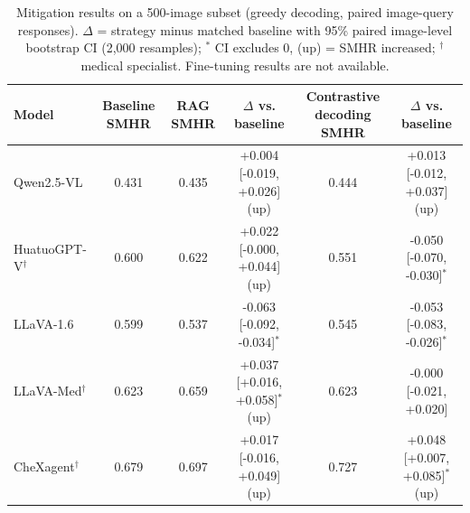 \begin{table}[t]
\centering
\footnotesize
\begin{tabular}{lccccc}
\toprule
Model & Baseline SMHR & RAG SMHR & $\Delta$ vs. baseline & Contrastive decoding SMHR & $\Delta$ vs. baseline \\
\midrule
Qwen2.5-VL & 0.431 & 0.435 & +0.004 [-0.019, +0.026] (up) & 0.444 & +0.013 [-0.012, +0.037] (up) \\
HuatuoGPT-V$^{\dagger}$ & 0.600 & 0.622 & +0.022 [-0.000, +0.044] (up) & 0.551 & -0.050 [-0.070, -0.030]$^{*}$ \\
LLaVA-1.6 & 0.599 & 0.537 & -0.063 [-0.092, -0.034]$^{*}$ & 0.545 & -0.053 [-0.083, -0.026]$^{*}$ \\
LLaVA-Med$^{\dagger}$ & 0.623 & 0.659 & +0.037 [+0.016, +0.058]$^{*}$ (up) & 0.623 & -0.000 [-0.021, +0.020] \\
CheXagent$^{\dagger}$ & 0.679 & 0.697 & +0.017 [-0.016, +0.049] (up) & 0.727 & +0.048 [+0.007, +0.085]$^{*}$ (up) \\
\bottomrule
\end{tabular}
\caption{Mitigation results on a 500-image subset (greedy decoding, paired image-query responses). $\Delta$ = strategy minus matched baseline with 95\% paired image-level bootstrap CI (2,000 resamples); $^{*}$ CI excludes 0, (up) = SMHR increased; $^{\dagger}$ medical specialist. Fine-tuning results are not available.}
\label{tab:mitigation}
\end{table}
